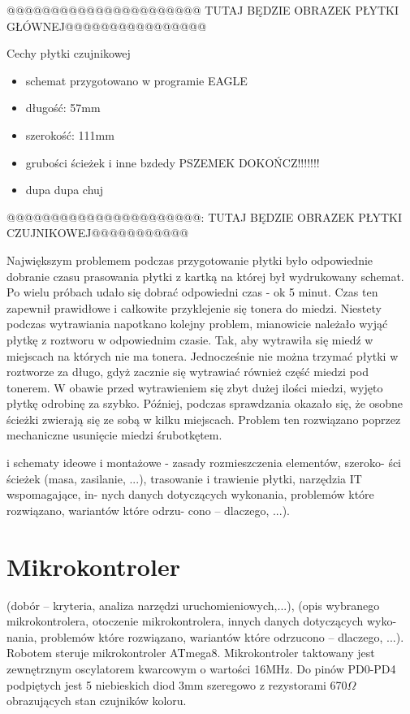 \documentclass[11pt,a4paper]{article}
\begin{document}
  @@@@@@@@@@@@@@@@@@@@@@ TUTAJ BĘDZIE OBRAZEK PŁYTKI GŁÓWNEJ@@@@@@@@@@@@@@@@

  Cechy płytki czujnikowej
  \begin{itemize}
    \item schemat przygotowano w programie EAGLE
    \item długość: 57mm
    \item szerokość: 111mm
    \item grubości ścieżek i inne bzdedy PSZEMEK DOKOŃCZ!!!!!!!
    \item dupa dupa chuj
  \end{itemize}

  @@@@@@@@@@@@@@@@@@@@@@: TUTAJ BĘDZIE OBRAZEK PŁYTKI CZUJNIKOWEJ@@@@@@@@@@@

Największym problemem podczas przygotowanie płytki było odpowiednie dobranie czasu prasowania płytki z kartką na której był wydrukowany schemat. Po wielu próbach udało się dobrać odpowiedni czas - ok 5 minut. Czas ten zapewnił prawidłowe i całkowite przyklejenie się tonera do miedzi. Niestety podczas wytrawiania napotkano kolejny problem, mianowicie należało wyjąć płytkę z roztworu w odpowiednim czasie. Tak, aby wytrawiła się miedź w miejscach na których nie ma tonera. Jednocześnie nie można trzymać płytki w roztworze za długo, gdyż zacznie się wytrawiać również część miedzi pod tonerem. W obawie przed wytrawieniem się zbyt dużej ilości miedzi, wyjęto płytkę odrobinę za szybko. Później, podczas sprawdzania okazało się, że osobne ścieżki zwierają się ze sobą w kilku miejscach. Problem ten rozwiązano poprzez mechaniczne usunięcie miedzi śrubotkętem.

 i schematy ideowe i montażowe - zasady rozmieszczenia elementów, szeroko-
ści ścieżek (masa, zasilanie, ...), trasowanie i trawienie płytki, narzędzia IT wspomagające, in-
nych danych dotyczących wykonania, problemów które rozwiązano, wariantów które odrzu-
cono – dlaczego, ...).

\section{Mikrokontroler}
(dobór – kryteria, analiza narzędzi uruchomieniowych,...), (opis
wybranego mikrokontrolera, otoczenie mikrokontrolera, innych danych dotyczących wyko-
nania, problemów które rozwiązano, wariantów które odrzucono – dlaczego, ...).
  Robotem steruje mikrokontroler ATmega8.
  Mikrokontroler taktowany jest zewnętrznym oscylatorem kwarcowym o wartości 16MHz. Do pinów PD0-PD4 podpiętych jest 5 niebieskich diod 3mm szeregowo z rezystorami 670$\Omega$ obrazujących stan czujników koloru.
   
\end{document}
